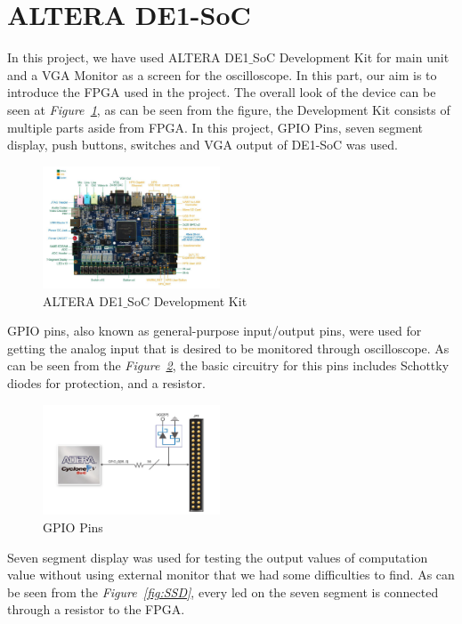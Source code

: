 \documentclass[paper]{IEEEtran}
\begin{document}
\section{ALTERA DE1-SoC}
\- \indent
	In this project, we have used ALTERA DE1$\_$SoC Development Kit for main unit and a VGA Monitor as a screen for the oscilloscope. In this part, our aim is to introduce the FPGA used in the project. The overall look of the device can be seen at \textit{Figure~\ref{fig:FPGA}}, as can be seen from the figure, the Development Kit consists of multiple parts aside from FPGA. In this project, GPIO Pins, seven segment display, push buttons, switches and VGA output of DE1-SoC was used.  

\begin{figure}[H]
	\setlength{\unitlength}{\textwidth}
	\center 
	\includegraphics[width=0.47\textwidth]{FPGA}
	\caption{\label{fig:FPGA}ALTERA DE1$\_$SoC Development Kit}
\end{figure}

	GPIO pins, also known as general-purpose input/output pins, were used for getting the analog input that is desired to be monitored through oscilloscope. As can be seen from the \textit{Figure~\ref{fig:GPIO}}, the basic circuitry for this pins includes Schottky diodes for protection, and a resistor.
	
\begin{figure}[H]
	\setlength{\unitlength}{\textwidth}
	\center 
	\includegraphics[width=0.47\textwidth]{GPIOpins}
	\caption{\label{fig:GPIO}GPIO Pins}
\end{figure}

	Seven segment display was used for testing the output values of computation value without using external monitor that we had some difficulties to find. As can be seen from the \textit{Figure~\ref{fig:SSD}}, every led on the seven segment is connected through a resistor to the FPGA.
\end{document}

